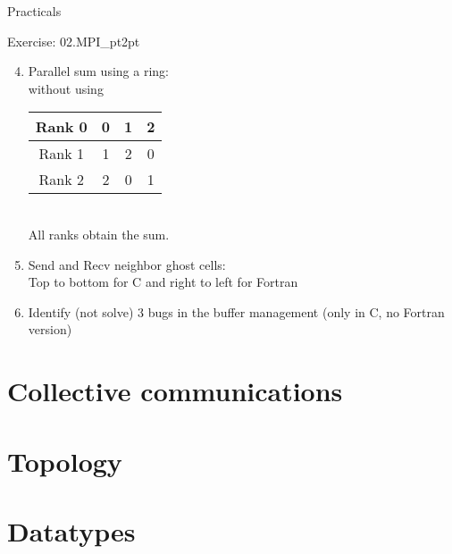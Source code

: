\documentclass[aspectratio=43]{beamer}
\begin{document}
\begin{frame}[fragile]{Practicals}
    \begin{brown2block}{Exercise: 02.MPI\_pt2pt}
    \begin{enumerate}
        \setcounter{enumi}{3}
    \item Parallel sum using a ring:\\
        without using \\
            \begin{tabular}{|c||c|c|c|}\hline
                Rank 0 & 0 & 1 & 2 \\\hline
                Rank 1 & 1 & 2 & 0 \\\hline
                Rank 2 & 2 & 0 & 1 \\\hline
        \end{tabular}\\
        All ranks obtain the sum.
        \item Send and Recv neighbor ghost cells:\\
            Top to bottom for C and right to left for Fortran
        \item Identify (not solve) 3 bugs in the buffer management (only in C, no Fortran version)
    \end{enumerate}
    \end{brown2block}
\end{frame}

\section{Collective communications}
\section{Topology}
\section{Datatypes}

\end{document}
